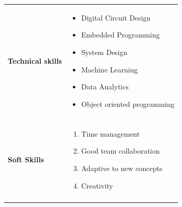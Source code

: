 \documentclass[a4paper,11pt,oneside]{article}
\begin{document}
\newpage
\noindent \begin{tabular}{@{} p{} p{\textwidth}}
 \textbf{\large{Technical skills }}
    & \vspace{-2em}
      \begin{itemize}
        \setlength\itemsep{0.1em}
        \item Digital Circuit Design
        \item Embedded Programming
        \item System Design
        \item Machine Learning
        \item Data Analytics
        \item Object oriented programming
    \end{itemize}\\ \\
    
 \textbf{\large{Soft Skills}}
    & \vspace{-2em}
      \begin{enumerate}
        \setlength\itemsep{0.1em}
        \item Time management
        \item Good team collaboration
        \item Adaptive to new concepts
        \item Creativity
      \end{enumerate} \\ \\
 

\end{tabular}
\end{document}
